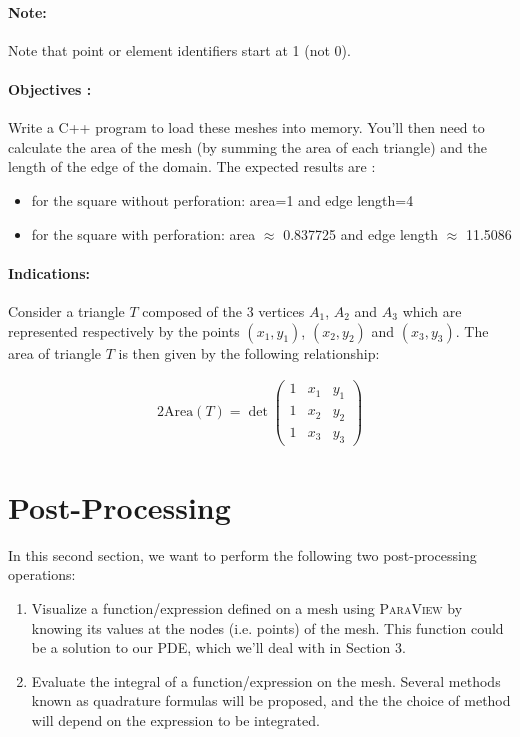 \documentclass[11pt,a4paper]{article}
\begin{document}
\paragraph{Note:} Note that point or element identifiers start at 1 (not 0).

\paragraph{Objectives :}
Write a C++ program to load these meshes into memory. You'll then need to calculate the area of the mesh (by summing the area of each triangle) and the length of the edge of the domain.
The expected results are :
\begin{itemize}
\item for the square without perforation: area=1 and edge length=4
\item for the square with perforation: area $\approx$ 0.837725 and edge length $\approx$ 11.5086
\end{itemize}


\paragraph{Indications:}
Consider a triangle $T$ composed of the 3 vertices $A_1$, $A_2$ and $A_3$ which are represented respectively by the points $(x_1,y_1)$, $(x_2,y_2)$ and $(x_3,y_3)$.
The area of triangle $T$ is then given by the following relationship:

\begin{eqnarray*}
2 \mathrm{Area}(T) = \det \left(
  \begin{matrix}
    1 & x_1 & y_1 \\
    1 & x_2 & y_2 \\
    1 & x_3 & y_3
  \end{matrix}
  \right)
\end{eqnarray*}




\section{Post-Processing}

In this second section, we want to perform the following two post-processing operations:
\begin{enumerate}
\item Visualize a function/expression defined on a mesh using \textsc{ParaView} by knowing its values at the nodes (i.e. points) of the mesh.
  This function could be a solution to our PDE, which we'll deal with in Section 3.
\item Evaluate the integral of a function/expression on the mesh. Several methods known as quadrature formulas will be proposed, and the
  the choice of method will depend on the expression to be integrated.
\end{enumerate}
\end{document}
